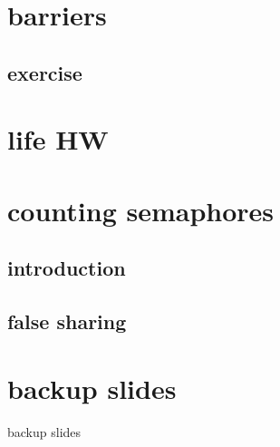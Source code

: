 \date{}
\title{}
\date{}

\begin{frame}
    \titlepage
\end{frame}



\section{barriers}


\subsection{exercise}


\section{life HW}




\section{counting semaphores}
\subsection{introduction}



\subsection{false sharing}







\section{backup slides}
\begin{frame}{backup slides}
\end{frame}






